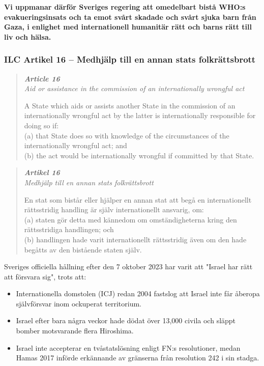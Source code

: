 \textbf{Vi uppmanar därför Sveriges regering att omedelbart bistå WHO:s evakueringsinsats och ta emot svårt skadade och svårt sjuka barn från Gaza, i enlighet med internationell humanitär rätt och barns rätt till liv och hälsa.}


\subsubsection*{ILC Artikel 16 – Medhjälp till en annan stats folkrättsbrott}

\begin{quote}
\itshape
\textbf{Article 16} \\
\textit{Aid or assistance in the commission of an internationally wrongful act}

A State which aids or assists another State in the commission of an internationally wrongful act by the latter is internationally responsible for doing so if: \\
(a) that State does so with knowledge of the circumstances of the internationally wrongful act; and \\
(b) the act would be internationally wrongful if committed by that State.
\end{quote}

\begin{quote}
\itshape
\textbf{Artikel 16} \\
\textit{Medhjälp till en annan stats folkrättsbrott}

En stat som bistår eller hjälper en annan stat att begå en internationellt rättsstridig handling är själv internationellt ansvarig, om: \\
(a) staten gör detta med kännedom om omständigheterna kring den rättsstridiga handlingen; och \\
(b) handlingen hade varit internationellt rättsstridig även om den hade begåtts av den bistående staten själv.
\end{quote}

Sveriges officiella hållning efter den 7 oktober 2023 har varit att "Israel har rätt att försvara sig", trots att:

\begin{itemize}
\item Internationella domstolen (ICJ) redan 2004 fastslog att Israel inte får åberopa självförsvar inom ockuperat territorium.
\item Israel efter bara några veckor hade dödat över 13,000 civila och släppt bomber motsvarande flera Hiroshima.
\item Israel inte accepterar en tvåstatslösning enligt FN:s resolutioner, medan Hamas 2017 införde erkännande av gränserna från resolution 242 i sin stadga.
\end{itemize}


